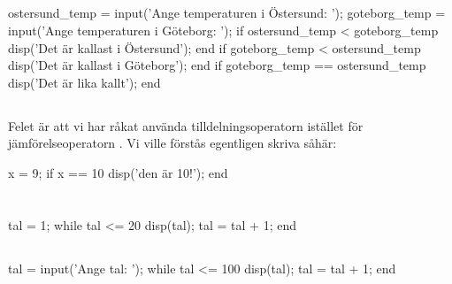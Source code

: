 \subsection*{}
\vspace{3pt}
\begin{matlab}
ostersund_temp = input('Ange temperaturen i Östersund: ');
goteborg_temp = input('Ange temperaturen i Göteborg: ');
if ostersund_temp < goteborg_temp
    disp('Det är kallast i Östersund');
end
if goteborg_temp < ostersund_temp
    disp('Det är kallast i Göteborg');
end
if goteborg_temp == ostersund_temp
    disp('Det är lika kallt');
end
\end{matlab}

\subsection*{}
Felet är att vi har råkat använda tilldelningsoperatorn \cw{=} istället för jämförelseoperatorn \cw{==}. Vi ville förstås egentligen skriva såhär:
\vspace{10pt}
\begin{matlab}
x = 9;
if x == 10
    disp('den är 10!');
end
\end{matlab}



\section*{}

\subsection*{}
\vspace{3pt}
\begin{matlab}
tal = 1;
while tal <= 20
	disp(tal);
	tal = tal + 1;
end
\end{matlab}

\subsection*{}
\vspace{3pt}
\begin{matlab}
tal = input('Ange tal: ');
while tal <= 100
	disp(tal);
	tal = tal + 1;
end
\end{matlab}

